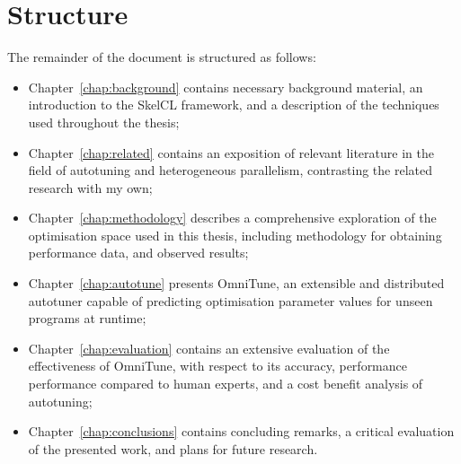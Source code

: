 \section{Structure}

The remainder of the document is structured as follows:

\begin{itemize}
\item Chapter~\ref{chap:background} contains necessary background
  material, an introduction to the SkelCL framework, and a description
  of the techniques used throughout the thesis;
\item Chapter~\ref{chap:related} contains an exposition of relevant
  literature in the field of autotuning and heterogeneous parallelism,
  contrasting the related research with my own;
\item Chapter~\ref{chap:methodology} describes a comprehensive
  exploration of the optimisation space used in this thesis, including
  methodology for obtaining performance data, and observed results;
\item Chapter~\ref{chap:autotune} presents OmniTune, an extensible and
  distributed autotuner capable of predicting optimisation parameter
  values for unseen programs at runtime;
\item Chapter~\ref{chap:evaluation} contains an extensive evaluation
  of the effectiveness of OmniTune, with respect to its accuracy,
  performance performance compared to human experts, and a cost
  benefit analysis of autotuning;
\item Chapter~\ref{chap:conclusions} contains concluding remarks, a
  critical evaluation of the presented work, and plans for future
  research.
\end{itemize}
